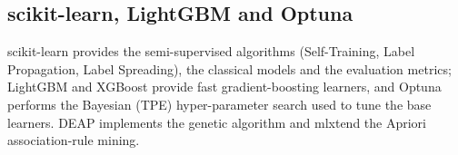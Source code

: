 
\subsection{scikit-learn, LightGBM and Optuna}
scikit-learn provides the semi-supervised algorithms (Self-Training, Label Propagation, Label
Spreading), the classical models and the evaluation metrics; LightGBM and XGBoost provide fast
gradient-boosting learners, and Optuna performs the Bayesian (TPE) hyper-parameter search used
to tune the base learners. DEAP implements the genetic algorithm and mlxtend the Apriori
association-rule mining.
